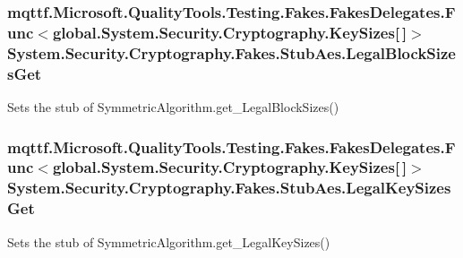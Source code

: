 \hypertarget{class_system_1_1_security_1_1_cryptography_1_1_fakes_1_1_stub_aes_a2ad8c2f2606b0cd7a9555361da58ee18}{
\subsubsection[{Legal\-Block\-Sizes\-Get}]{\setlength{\rightskip}{0pt plus 5cm}mqttf.\-Microsoft.\-Quality\-Tools.\-Testing.\-Fakes.\-Fakes\-Delegates.\-Func$<$global.\-System.\-Security.\-Cryptography.\-Key\-Sizes\mbox{[}$\,$\mbox{]}$>$ System.\-Security.\-Cryptography.\-Fakes.\-Stub\-Aes.\-Legal\-Block\-Sizes\-Get}}\label{class_system_1_1_security_1_1_cryptography_1_1_fakes_1_1_stub_aes_a2ad8c2f2606b0cd7a9555361da58ee18}


Sets the stub of Symmetric\-Algorithm.\-get\-\_\-\-Legal\-Block\-Sizes()

\hypertarget{class_system_1_1_security_1_1_cryptography_1_1_fakes_1_1_stub_aes_a8349b1894584464ef252f705062f37ad}{
\subsubsection[{Legal\-Key\-Sizes\-Get}]{\setlength{\rightskip}{0pt plus 5cm}mqttf.\-Microsoft.\-Quality\-Tools.\-Testing.\-Fakes.\-Fakes\-Delegates.\-Func$<$global.\-System.\-Security.\-Cryptography.\-Key\-Sizes\mbox{[}$\,$\mbox{]}$>$ System.\-Security.\-Cryptography.\-Fakes.\-Stub\-Aes.\-Legal\-Key\-Sizes\-Get}}\label{class_system_1_1_security_1_1_cryptography_1_1_fakes_1_1_stub_aes_a8349b1894584464ef252f705062f37ad}


Sets the stub of Symmetric\-Algorithm.\-get\-\_\-\-Legal\-Key\-Sizes()

